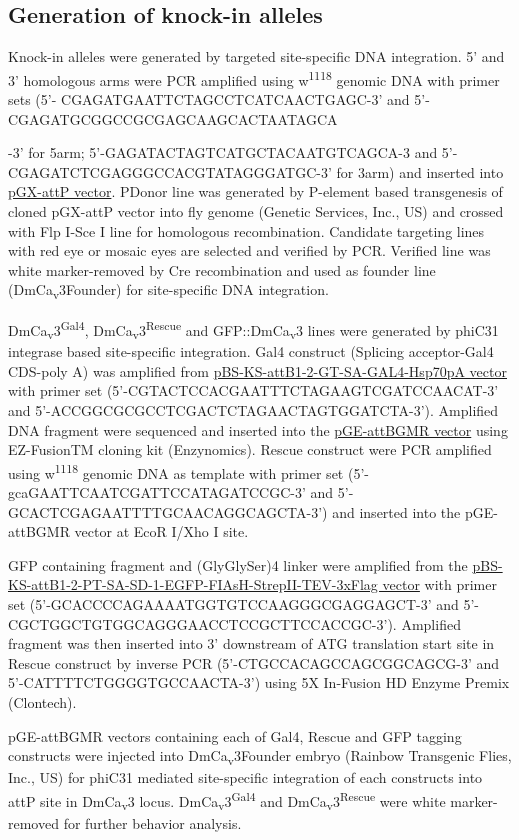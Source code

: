 \subsection*{Generation of knock-in alleles}

Knock-in alleles were generated by targeted site-specific DNA integration.
5' and 3' homologous arms were PCR amplified using w\textsuperscript{1118} genomic DNA with primer sets (5'- CGAGATGAATTCTAGCCTCATCAACTGAGC-3' and 5'- CGAGATGCGGCCGCGAGCAAGCACTAATAGCA

-3' for 5arm; 5'-GAGATACTAGTCATGCTACAATGTCAGCA-3 and 5'-CGAGATCTCGAGGGCCACGTATAGGGATGC-3' for 3arm) and inserted into \href{https://dgrc.cgb.indiana.edu/product/View?product=1293}{pGX-attP vector}.
P{Donor} line was generated by P-element based transgenesis of cloned pGX-attP vector into fly genome (Genetic Services, Inc., US) and crossed with Flp I-Sce I line for homologous recombination.
Candidate targeting lines with red eye or mosaic eyes are selected and verified by PCR.
Verified line was white marker-removed by Cre recombination and used as founder line (DmCa\textsubscript{v}3Founder) for site-specific DNA integration.

DmCa\textsubscript{v}3\textsuperscript{Gal4}, DmCa\textsubscript{v}3\textsuperscript{Rescue} and GFP::DmCa\textsubscript{v}3 lines were generated by phiC31 integrase based site-specific integration.
Gal4 construct (Splicing acceptor-Gal4 CDS-poly A) was amplified from \href{https://dgrc.cgb.indiana.edu/product/View?product=1325}{pBS-KS-attB1-2-GT-SA-GAL4-Hsp70pA vector} with primer set (5'-CGTACTCCACGAATTTCTAGAAGTCGATCCAACAT-3' and 5'-ACCGGCGCGCCTCGACTCTAGAACTAGTGGATCTA-3').
Amplified DNA fragment were sequenced and inserted into the \href{https://dgrc.cgb.indiana.edu/product/View?product=1295}{pGE-attBGMR vector} using EZ-FusionTM cloning kit (Enzynomics).
Rescue construct were PCR amplified using w\textsuperscript{1118} genomic DNA as template with primer set (5'-gcaGAATTCAATCGATTCCATAGATCCGC-3' and 5'-GCACTCGAGAATTTTGCAACAGGCAGCTA-3') and inserted into the pGE-attBGMR vector at EcoR I/Xho I site. 

GFP containing fragment and (GlyGlySer)4 linker were amplified from the \href{https://dgrc.cgb.indiana.edu/product/View?product=1306}{pBS-KS-attB1-2-PT-SA-SD-1-EGFP-FIAsH-StrepII-TEV-3xFlag vector} with primer set (5'-GCACCCCAGAAAATGGTGTCCAAGGGCGAGGAGCT-3' and 5'-CGCTGGCTGTGGCAGGGAACCTCCGCTTCCACCGC-3').
Amplified fragment was then inserted into 3' downstream of ATG translation start site in Rescue construct by inverse PCR (5'-CTGCCACAGCCAGCGGCAGCG-3' and 5'-CATTTTCTGGGGTGCCAACTA-3') using 5X In-Fusion HD Enzyme Premix (Clontech).  

pGE-attBGMR vectors containing each of Gal4, Rescue and GFP tagging constructs were injected into DmCa\textsubscript{v}3Founder embryo (Rainbow Transgenic Flies, Inc., US) for phiC31 mediated site-specific integration of each constructs into attP site in DmCa\textsubscript{v}3 locus.
DmCa\textsubscript{v}3\textsuperscript{Gal4} and DmCa\textsubscript{v}3\textsuperscript{Rescue} were white marker-removed for further behavior analysis.